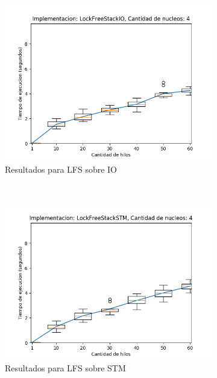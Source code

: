\begin{appendices}
\begin{figure}[t]
\begin{subfigure}[b]{0.49\textwidth}
        \includegraphics[width=\textwidth]{images/numberOfThreads/plots/expLFSIO-4}
        \caption{Resultados para LFS sobre IO}
        \label{subfig:numberOfThreads-lfsio-4}
    \end{subfigure}
    ~
    \begin{subfigure}[b]{0.49\textwidth}
        \includegraphics[width=\textwidth]{images/numberOfThreads/plots/expLFSSTM-4}
        \caption{Resultados para LFS sobre STM}
        \label{subfig:numberOfThreads-lfsstm-4}
    \end{subfigure}
    \begin{subfigure}[b]{0.49\textwidth}

\end{subfigure}
\end{figure}
\end{appendices}

